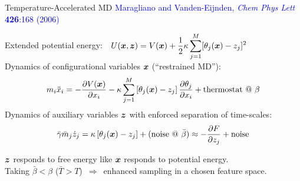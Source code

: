 \begin{frame}[fragile]{Temperature-Accelerated MD}
\vspace{-5mm}
\textcolor{blue}{\tiny Maragliano and Vanden-Eijnden, {\it Chem Phys Lett} {\bf 
426}:168 (2006)}

Extended potential energy:\ \ $\displaystyle U({\boldsymbol x},{\boldsymbol z}) = V({\boldsymbol x}) + 
\frac{1}{2}\kappa\sum_{j=1}^{M}[\theta_j({\boldsymbol x})-z_j]^2$\\
Dynamics of configurational variables ${\boldsymbol x}$ (``restrained MD''):
\begin{displaymath}
m_i\ddot{x}_i = -\frac{\partial V({\boldsymbol x})}{\partial 
x_i}-\kappa\sum_{j=1}^{M}\left[\theta_j({\boldsymbol x})-z_j\right]\frac{\partial\theta_j}{
\partial x_i}+\mbox{thermostat @ $\beta$}
\end{displaymath}
Dynamics of auxiliary variables ${\boldsymbol z}$ with enforced separation of time-scales:
\begin{displaymath}
\bar\gamma\bar{m}_j\dot{z}_j = \kappa\left[\theta_j({\boldsymbol x})-z_j\right] + 
(\mbox{noise @ $\bar\beta$}) \approx -\frac{\partial F}{\partial z_j} + 
\mbox{noise}
\end{displaymath}

${\boldsymbol z}$ responds to free energy like ${\boldsymbol x}$ responds to potential energy.\\
Taking $\bar\beta < \beta$ ($\bar{T} > T$)\ $\Rightarrow$\ enhanced sampling in 
a chosen feature space.

\end{frame}

